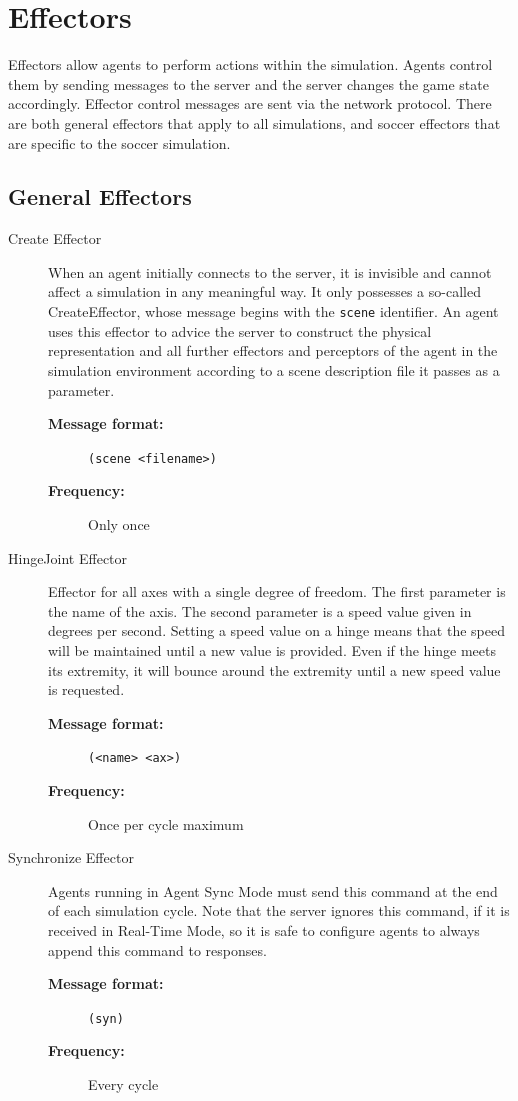 \section{Effectors}

Effectors allow agents to perform actions within the simulation. Agents control them by sending messages to the server and the server changes the game state accordingly.
Effector control messages are sent via the network protocol. There are both general effectors that apply to all simulations, and soccer effectors that are specific to the soccer simulation.
\subsection{General Effectors}
\begin{description}


\item [Create Effector]
When an agent initially connects to the server, it is invisible and cannot affect a simulation in any meaningful way. It only possesses a so-called CreateEffector, whose message begins with the \texttt{scene} identifier. An agent uses this effector to advice the server to construct the physical representation and all further effectors and perceptors of the agent in the simulation environment according to a scene description file it passes as a parameter.
  \begin{description}
  \item[{\bf Message format:}]
  \texttt{(scene <filename>)}
  \item[{\bf Frequency:}]
  Only once
  \end{description}

  \item [HingeJoint Effector]
Effector for all axes with a single degree of freedom. The first parameter is the name of the axis. The second parameter is a speed value given in degrees per second. Setting a speed value on a hinge means that the speed will be maintained until a new value is provided. Even if the hinge meets its extremity, it will bounce around the extremity until a new speed value is requested.
  \begin{description}
  \item[{\bf Message format:}]
  \texttt{(<name> <ax>)}
  \item[{\bf Frequency:}]
  Once per cycle maximum
  \end{description}

  \item [Synchronize Effector]
  Agents running in Agent Sync Mode must send this command at the end of each simulation cycle. Note that the server ignores this command, if it is received in Real-Time Mode, so it is safe to configure agents to always append this command to responses.
  \begin{description}
  \item[{\bf Message format:}]
  \texttt{(syn)}
  \item[{\bf Frequency:}]
  Every cycle
  \end{description}

\end{description}




